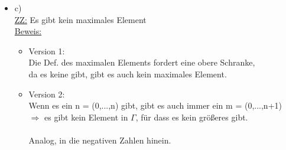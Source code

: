 \documentclass[a4paper]{scrartcl}
\begin{document}
\begin{itemize}
\begin{itemize}
            \end{itemize}

        \item c)\\
            \underline{ZZ:} Es gibt kein maximales Element\\
            \underline{Beweis:}\\
                \begin{itemize}
                    \item Version 1:\\
                        Die Def. des maximalen Elements fordert eine obere Schranke,\\
                        da es keine gibt, gibt es auch kein maximales Element.\\

                    \item Version 2:\\
                        Wenn es ein n = (0,...,n) gibt, gibt es auch immer ein m = (0,...,n+1)\\
                        $\Rightarrow$ es gibt kein Element in $\Gamma$, für dass es kein größeres gibt.\\
                        \\Analog, in die negativen Zahlen hinein.\\
                \end{itemize}

    \end{itemize}

\end{document}
